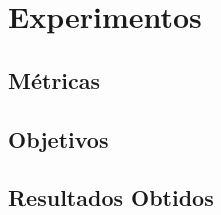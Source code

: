 \chapter{Experimentos} \label{cap4}


\section{Métricas}


\section{Objetivos}


\section{Resultados Obtidos}


